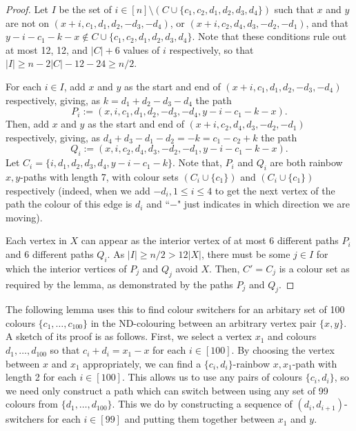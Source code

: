 \begin{proof}
Let $I$ be the set of $i\in [n]\setminus (C\cup\{c_1,c_2,d_1,d_2,d_3,d_4\})$ such that $x$ and $y$ are not on $(x+i,c_1,d_1,d_2,-d_3,-d_4)$, or $(x+i,c_2,d_4,d_3,-d_2,-d_1)$, and that $y-i-c_1-k-x\notin C\cup\{c_1,c_2,d_1,d_2,d_3,d_4\}$. Note that these conditions rule out at most 12, 12, and $|C|+6$ values of $i$ respectively, so that $|I|\geq n-2|C|-12-24\geq n/2$.

For each $i\in I$, add $x$ and $y$ as the start and end of
 $(x+i,c_1,d_1,d_2,-d_3,-d_4)$ respectively, giving, as $k=d_1+d_2-d_3-d_4$ the path
 \[
 P_i:=(x,i,c_1,d_1,d_2,-d_3,-d_4,y-i-c_1-k-x).
 \]
Then, add $x$ and $y$ as the start and end of
 $(x+i,c_2,d_4,d_3,-d_2,-d_1)$ respectively, giving, as $d_4+d_3-d_1-d_2=-k=c_1-c_2+k$ the path
 \[
 Q_i:=(x,i,c_2,d_4,d_3,-d_2,-d_1,y-i-c_1-k-x).
 \]
Let $C_i=\{i,d_1,d_2,d_3,d_4,y-i-c_1-k\}$. Note that, $P_i$ and $Q_i$ are both rainbow $x,y$-paths with length 7, with colour sets $(C_i\cup\{c_1\})$ and $(C_i\cup\{c_1\})$ respectively (indeed, when we add $-d_i, 1 \leq i \leq 4$ to get the next vertex of the path the colour of this edge is $d_i$ and ``$-$" just indicates in which direction we are moving). 

Each vertex in $X$ can appear as the interior vertex of at most 6 different paths $P_i$ and 6 different paths $Q_i$. As $|I|\geq n/2 > 12|X|$, there must be some $j\in I$ for which the interior vertices of  $P_j$ and $Q_j$ avoid $X$. Then, $C'=C_j$ is a colour set as required by the lemma, as demonstrated by the paths $P_j$ and $Q_j$.
\end{proof}

The following lemma uses this to find colour switchers for an arbitary set of 100 colours $\{c_1,\ldots,c_{100}\}$ in the ND-colouring between an arbitrary vertex pair $\{x,y\}$. A sketch of its proof is as follows. First, we select a vertex $x_1$ and colours $d_1,\ldots,d_{100}$ so that $c_i+d_i=x_1-x$ for each $i\in [100]$. By choosing the vertex between $x$ and $x_1$ appropriately, we can find a $\{c_i,d_i\}$-rainbow $x,x_1$-path with length 2 for each $i\in [100]$. This allows us to use any pairs of colours $\{c_i,d_i\}$, so we need only construct a path which can switch between using any set of 99 colours from $\{d_1,\ldots,d_{100}\}$. This we do by constructing a sequence of $(d_i,d_{i+1})$-switchers for each $i\in [99]$ and putting them together between $x_1$ and $y$.

